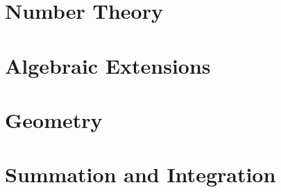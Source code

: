 \documentclass[10pt]{book}
\begin{document}


\setcounter{page}{1}

\part{Number Theory}






\part{Algebraic Extensions}








%

\part{Geometry}







%

\part{Summation and Integration}










%


\appendix

\listofsymbols






\end{document}
